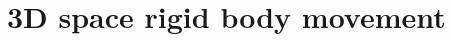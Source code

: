 \documentclass{report}
\begin{document}
\chapter{3D space rigid body movement}
\label{cpt: 3}



\newpage



\newpage



\newpage



\newpage



\newpage



\newpage



\newpage



\newpage



\newpage
\end{document}
